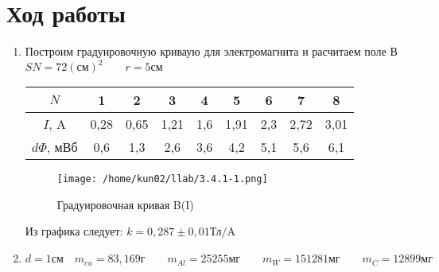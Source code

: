 \documentclass[a4paper]{article}
\begin{document}
\section{Ход работы}
\begin{enumerate}
	\item Построим градуировочную криваую для электромагнита и расчитаем поле В
	\hfill\break $SN = 72 (\text{см})^2 \qquad r= 5 \text{см}$
	
	\begin{center}
	\begin{tabular}{|c|c|c|c|c|c|c|c|c|} \hline
	
	$N$ &1&2&3&4&5&6&7&8 \\ \hline
	$I$, A & 0,28 &0,65&1,21&1,6&1,91&2,3&2,72& 3,01 \\ \hline
	$d\Phi$, мВб &0,6&1,3&2,6&3,6&4,2&5,1&5,6&6,1  \\ \hline
	
	\end{tabular}
\end{center}
\begin{figure}[h!]
	\centering
	\texttt{[image: /home/kun02/llab/3.4.1-1.png]}
	\caption{Градуировочная кривая B(I)}
	\label{pic:1}
\end{figure}
\par Из графика следует: $k = 0,287 \pm 0,01 \text{Тл/A}$
	\item $d = 1  \text{см} \quad m_{cu} = 83, 169 \text{г} \qquad m_{Al} = 25 255 \text{мг} \qquad m_{W} = 151 281 \text{мг}  \qquad m_{C} = 12 899 \text{мг}$
		\begin{center}
		\begin{tabular}{|c|c|c|c|c|c|c|c|c|} \hline
			

\end{tabular}
\end{center}
\end{enumerate}
\end{document}
